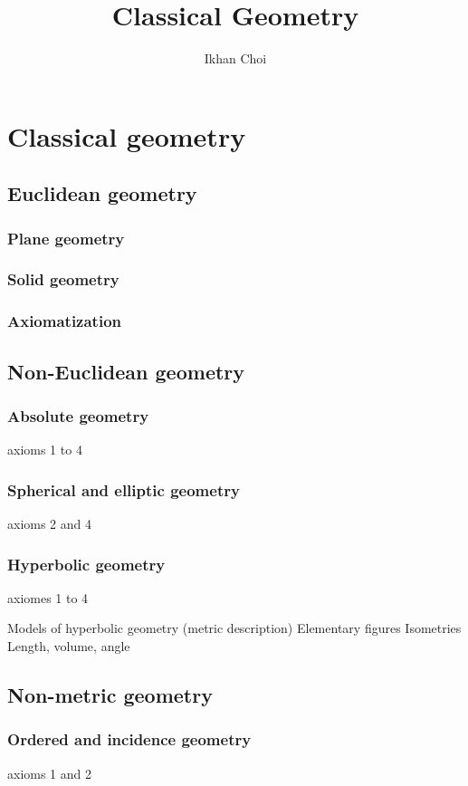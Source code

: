 \documentclass{../../large}
\begin{document}
\title{Classical Geometry}
\author{Ikhan Choi}
\maketitle
\tableofcontents

\part{Classical geometry}
\chapter{Euclidean geometry}

\section{Plane geometry}
\section{Solid geometry}
\section{Axiomatization}

\chapter{Non-Euclidean geometry}
\section{Absolute geometry}
axioms 1 to 4
\section{Spherical and elliptic geometry}
axioms 2 and 4
\section{Hyperbolic geometry}
axiomes 1 to 4

Models of hyperbolic geometry (metric description)
Elementary figures
Isometries
Length, volume, angle

\chapter{Non-metric geometry}
\section{Ordered and incidence geometry}
axioms 1 and 2
\end{document}
